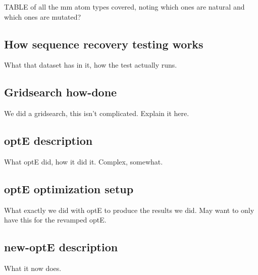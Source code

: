 TABLE of all the mm atom types covered, noting which ones are natural and which ones are mutated?

\subsection{How sequence recovery testing works}
What that dataset has in it, how the test actually runs.

\subsection{Gridsearch how-done}
We did a gridsearch, this isn't complicated. Explain it here.


\subsection{optE description}
What optE did, how it did it. Complex, somewhat.

\subsection{optE optimization setup}
What exactly we did with optE to produce the results we did. May want to only have this for the revamped optE.

\subsection{new-optE description}
What it now does.
